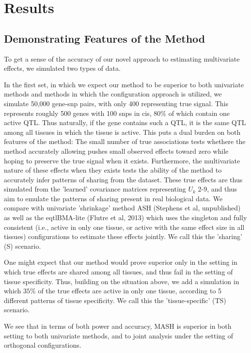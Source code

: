 \section{Results}
\subsection{Demonstrating Features of the Method}

To get a sense of the accuracy of our novel approach to estimating multivariate effects, we simulated two types of data. 

In the first set, in which we expect our method to be superior to both univariate methods and methods in which the configuration approach is utilized, we simulate 50,000 gene-snp pairs, with only 400 representing true signal. This represents roughly 500 genes with 100 snps in cis,  $80\%$ of which contain one active QTL. Thus naturally, if the gene contains such a QTL, it is the same QTL among all tissues in which the tissue is active. This puts a dual burden on both features of the method: The small number of true associations tests whethere the method accurately allowing pushes small observed effects toward zero while hoping to preserve the true signal when it exists. Furthermore, the  multivariate nature of these effects when they exists tests the ability of the method to accurately infer patterns of sharing from the dataset. These true effects are thus simulated from the 'learned' covariance matrices representing $U_{k}$ 2-9, and thus aim to emulate the patterns of sharing present in real biological data. We compare with univariate 'shrinkage' method ASH (Stephens et al, unpublished) as well as the eqtlBMA-lite (Flutre et al, 2013) which uses the singleton and fully consistent (i.e., active in only one tissue, or active with the same effect size in all tissues) configurations to estimate these effects jointly. We call this the 'sharing' (S) scenario. 

One might expect that our method would prove superior only in the setting in which true effects are shared among all tissues, and thus fail in the setting of tissue specificity. Thus, building on the situation above, we add a simulation in which $35\%$ of the true effects are active in only one tissue, according to 5 different patterns of tissue specificity. We call this the 'tissue-specific' (TS) scenario. 

We see that in terms of both power and accuracy, MASH is superior in both setting to both univariate methods, and to joint analysis under the setting of orthogonal configurations.


